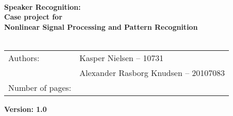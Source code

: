 \documentclass[Main]{subfiles}
\begin{document}
\begin{center}



\HRule \\[0.4cm]

{ \huge \bfseries Speaker Recognition:}\\[0.4cm]
{ \huge \bfseries Case project for }\\[0.4cm] 
{ \huge \bfseries Nonlinear Signal Processing and Pattern Recognition}\\[0.4cm]

\HRule \\[1.5cm]


\begin{tabular}{p{}|p{}}
\hline 
Authors: & Kasper Nielsen -- 10731\\ & Alexander Rasborg Knudsen -- 20107083 \\
\hline 
Number of pages: & \pageref{LastPage} \\
\hline 
\end{tabular} 

\bigskip

\textbf{\Large Version: 1.0}\\

\end{center}
\end{document}
